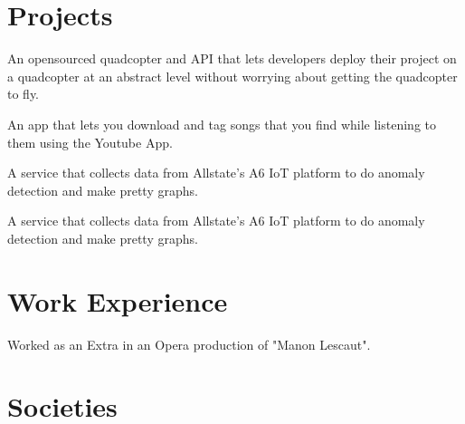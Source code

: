 \documentclass[]{deedy-resume-openfont}
\begin{document}
\begin{minipage}[t]{0.66\textwidth} 


\section{Projects}
An opensourced quadcopter and API that lets developers deploy their project on a quadcopter at an abstract level without worrying about getting the quadcopter to fly.
\sectionsep

An app that lets you download and tag songs that you find while listening to them using the Youtube App.
\sectionsep

A service that collects data from Allstate's A6 IoT platform to do anomaly detection and make pretty graphs.
\sectionsep

A service that collects data from Allstate's A6 IoT platform to do anomaly detection and make pretty graphs.
\sectionsep


\section{Work Experience} 
Worked as an Extra in an Opera production of "Manon Lescaut".

\sectionsep


\section{Societies} 


\end{minipage}
\end{document}
